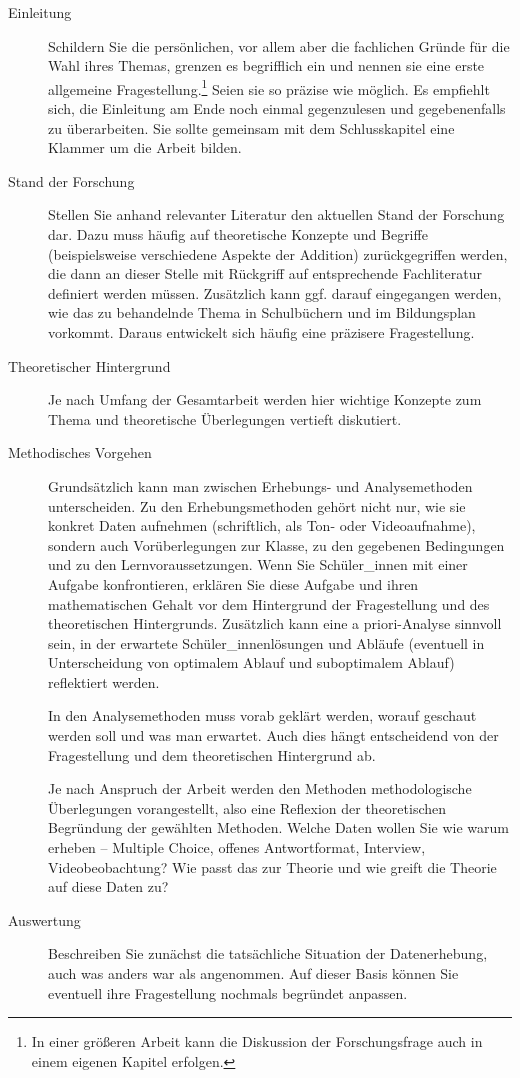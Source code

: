 \documentclass[ngerman,bibliography=totoc,oneside,12pt,a4paper]{scrbook}
\begin{document}
\begin{description}
\item[Einleitung]
Schildern Sie die persönlichen, vor allem aber die fachlichen Gründe für
die Wahl ihres Themas, grenzen es begrifflich ein und nennen sie eine
erste allgemeine Fragestellung.\footnote{In einer größeren Arbeit kann
  die Diskussion der Forschungsfrage auch in einem eigenen Kapitel
  erfolgen.} Seien sie so präzise wie möglich. Es empfiehlt sich, die
Einleitung am Ende noch einmal gegenzulesen und gegebenenfalls zu
überarbeiten. Sie sollte gemeinsam mit dem Schlusskapitel eine Klammer
um die Arbeit bilden.
\item[Stand der Forschung]
Stellen Sie anhand relevanter Literatur den aktuellen Stand der
Forschung dar. Dazu muss häufig auf theoretische Konzepte und Begriffe
(beispielsweise verschiedene Aspekte der Addition) zurückgegriffen
werden, die dann an dieser Stelle mit Rückgriff auf entsprechende
Fachliteratur definiert werden müssen. Zusätzlich kann ggf. darauf
eingegangen werden, wie das zu behandelnde Thema in Schulbüchern und im
Bildungsplan vorkommt. Daraus entwickelt sich häufig eine präzisere
Fragestellung.
\item[Theoretischer Hintergrund]
Je nach Umfang der Gesamtarbeit werden hier wichtige Konzepte zum Thema
und theoretische Überlegungen vertieft diskutiert.
\item[Methodisches Vorgehen]
Grundsätzlich kann man zwischen Erhebungs- und Analysemethoden
unterscheiden. Zu den Erhebungsmethoden gehört nicht nur, wie sie
konkret Daten aufnehmen (schriftlich, als Ton- oder Videoaufnahme),
sondern auch Vorüberlegungen zur Klasse, zu den gegebenen Bedingungen
und zu den Lernvoraussetzungen. Wenn Sie Schüler\_innen mit einer
Aufgabe konfrontieren, erklären Sie diese Aufgabe und ihren
mathematischen Gehalt vor dem Hintergrund der Fragestellung und des
theoretischen Hintergrunds. Zusätzlich kann eine a priori-Analyse
sinnvoll sein, in der erwartete Schüler\_innenlösungen und Abläufe
(eventuell in Unterscheidung von optimalem Ablauf und suboptimalem
Ablauf) reflektiert werden.

In den Analysemethoden muss vorab geklärt werden, worauf geschaut werden
soll und was man erwartet. Auch dies hängt entscheidend von der
Fragestellung und dem theoretischen Hintergrund ab.

Je nach Anspruch der Arbeit werden den Methoden methodologische
Überlegungen vorangestellt, also eine Reflexion der theoretischen
Begründung der gewählten Methoden. Welche Daten wollen Sie wie warum
erheben -- Multiple Choice, offenes Antwortformat, Interview,
Videobeobachtung? Wie passt das zur Theorie und wie greift die Theorie
auf diese Daten zu?
\item[Auswertung]
Beschreiben Sie zunächst die tatsächliche Situation der Datenerhebung,
auch was anders war als angenommen. Auf dieser Basis können Sie
eventuell ihre Fragestellung nochmals begründet anpassen.


\end{description}
\end{document}
